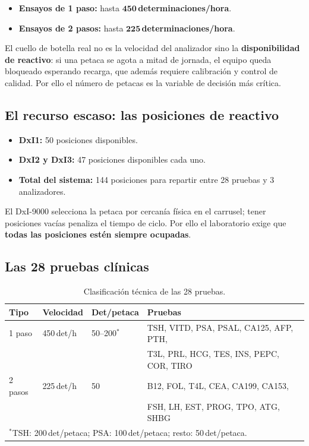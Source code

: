 \documentclass[12pt, a4paper]{article}
\begin{document}
\begin{itemize}
  \item \textbf{Ensayos de 1 paso:} hasta $\mathbf{450}$\,\textbf{determinaciones/hora}.
  \item \textbf{Ensayos de 2 pasos:} hasta $\mathbf{225}$\,\textbf{determinaciones/hora}.
\end{itemize}

El cuello de botella real no es la velocidad del analizador sino la
\textbf{disponibilidad de reactivo}: si una petaca se agota a mitad de jornada, el equipo
queda bloqueado esperando recarga, que además requiere calibración y control de calidad.
Por ello el número de petacas es la variable de decisión más crítica.

\subsection{El recurso escaso: las posiciones de reactivo}

\begin{itemize}
  \item \textbf{DxI1:} 50 posiciones disponibles.
  \item \textbf{DxI2 y DxI3:} 47 posiciones disponibles cada uno.
  \item \textbf{Total del sistema:} 144 posiciones para repartir entre 28 pruebas y 3 analizadores.
\end{itemize}

El DxI-9000 selecciona la petaca por cercanía física en el carrusel; tener posiciones
vacías penaliza el tiempo de ciclo. Por ello el laboratorio exige que
\textbf{todas las posiciones estén siempre ocupadas}.

\subsection{Las 28 pruebas clínicas}

\begin{table}[H]
\centering
\caption{Clasificación técnica de las 28 pruebas.}
\begin{tabular}{llll}
\toprule
\textbf{Tipo} & \textbf{Velocidad} & \textbf{Det/petaca} & \textbf{Pruebas} \\
\midrule
1 paso & 450\,det/h & 50--200$^*$ & TSH, VITD, PSA, PSAL, CA125, AFP, PTH, \\
       &            &             & T3L, PRL, HCG, TES, INS, PEPC, COR, TIRO \\
2 pasos & 225\,det/h & 50 & B12, FOL, T4L, CEA, CA199, CA153, \\
        &            &    & FSH, LH, EST, PROG, TPO, ATG, SHBG \\
\bottomrule
\multicolumn{4}{l}{$^*$TSH: 200\,det/petaca; PSA: 100\,det/petaca; resto: 50\,det/petaca.}
\end{tabular}
\end{table}
\end{document}
